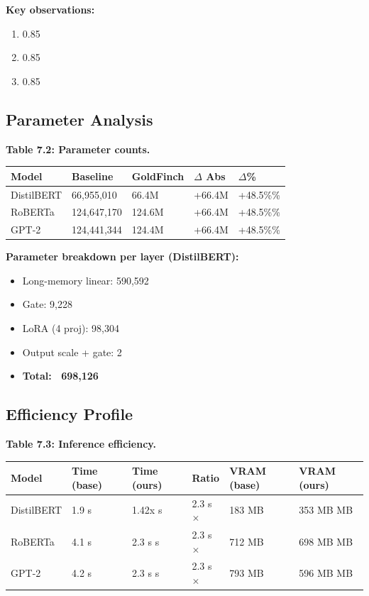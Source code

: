 \textbf{Key observations:}

\begin{enumerate}
\item 0.85
\item 0.85
\item 0.85

\end{enumerate}
\subsection{Parameter Analysis}

\textbf{Table 7.2: Parameter counts.}

\begin{table}[H]
\centering
\small
\begin{tabular}{lllll}
\toprule
\textbf{Model} & \textbf{Baseline} & \textbf{GoldFinch} & \textbf{$\Delta$ Abs} & \textbf{$\Delta$\%} \\
\midrule
DistilBERT & 66,955,010 & 66.4M & +66.4M & +48.5\%\% \\
RoBERTa & 124,647,170 & 124.6M & +66.4M & +48.5\%\% \\
GPT-2 & 124,441,344 & 124.4M & +66.4M & +48.5\%\% \\
\bottomrule
\end{tabular}
\end{table}

\textbf{Parameter breakdown per layer (DistilBERT):}
\begin{itemize}
\item Long-memory linear: 590,592
\item Gate: 9,228
\item LoRA (4 proj): 98,304
\item Output scale + gate: 2
\item \textbf{Total: ~698,126}

\end{itemize}
\subsection{Efficiency Profile}

\textbf{Table 7.3: Inference efficiency.}

\begin{table}[H]
\centering
\small
\begin{tabular}{llllll}
\toprule
\textbf{Model} & \textbf{Time (base)} & \textbf{Time (ours)} & \textbf{Ratio} & \textbf{VRAM (base)} & \textbf{VRAM (ours)} \\
\midrule
DistilBERT & 1.9 s & 1.42x s & 2.3 s$\times$ & 183 MB & 353 MB MB \\
RoBERTa & 4.1 s & 2.3 s s & 2.3 s$\times$ & 712 MB & 698 MB MB \\
GPT-2 & 4.2 s & 2.3 s s & 2.3 s$\times$ & 793 MB & 596 MB MB \\
\bottomrule
\end{tabular}
\end{table}

